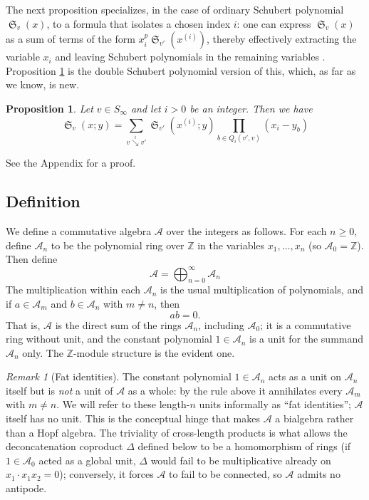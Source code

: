 \documentclass{amsart}
\newtheorem{proposition}[lemma]{Proposition}
\theoremstyle{definition}
\theoremstyle{remark}
\newtheorem*{remark}{Remark}
\numberwithin{equation}{subsection}
\DeclareMathOperator{\sch}{\mathfrak{S}}
\newcommand{\downvar}[1]{\stackrel{#1}{\searrow}}
\newcommand{\coma}{\mathcal{A}}
\begin{document}
	

The next proposition specializes, in the case of ordinary Schubert polynomial $\sch_v(x)$, to a formula that isolates a chosen index $i$: one can express $\sch_v(x)$ as a sum of terms of the form $x_i^p\sch_{v'}(x^{(i)})$, thereby effectively extracting the variable $x_i$ and leaving Schubert polynomials in the remaining variables \cite[Theorem~5.1]{bsskew}. Proposition \ref{proposition:pullindex} is the double Schubert polynomial version of this, which, as far as we know, is new.%

\begin{proposition} \label{proposition:pullindex}
Let $v\in S_\infty$ and let $i>0$ be an integer. Then we have
$$\sch_v(x;y)=\sum_{v\downvar{i} v'}\sch_{v'}(x^{(i)};y)\prod_{b\in Q_i(v',v)}(x_i - y_b)$$
\end{proposition}
See the Appendix for a proof.

\subsection{Definition}


We define a commutative algebra $\coma$ over the integers as follows. For each $n\geq 0$, define $\coma_n$ to be the polynomial ring over $\mathbb{Z}$ in the variables $x_1,\ldots,x_n$ (so $\coma_0=\mathbb{Z}$). Then define
$$\coma =\bigoplus_{n=0}^\infty \coma_n$$
The multiplication within each $\coma_n$ is the usual multiplication of polynomials, and if $a\in \coma_m$ and $b\in \coma_n$ with $m\neq n$, then
$$ab = 0\text{.}$$
That is, $\coma$ is the direct sum of the rings $\coma_n$, including $\coma_0$; it is a commutative ring without unit, and the constant polynomial $1\in\coma_n$ is a unit for the summand $\coma_n$ only. The $\mathbb{Z}$-module structure is the evident one.

\begin{remark}[Fat identities]\label{remark:fatidentity}
The constant polynomial $1\in\coma_n$ acts as a unit on $\coma_n$ itself but is \emph{not} a unit of $\coma$ as a whole: by the rule above it annihilates every $\coma_m$ with $m\neq n$. We will refer to these length-$n$ units informally as ``fat identities''; $\coma$ itself has no unit. This is the conceptual hinge that makes $\coma$ a bialgebra rather than a Hopf algebra. The triviality of cross-length products is what allows the deconcatenation coproduct $\Delta$ defined below to be a homomorphism of rings (if $1\in\coma_0$ acted as a global unit, $\Delta$ would fail to be multiplicative already on $x_1\cdot x_1x_2=0$); conversely, it forces $\coma$ to fail to be connected, so $\coma$ admits no antipode.
\end{remark}
\end{document}
